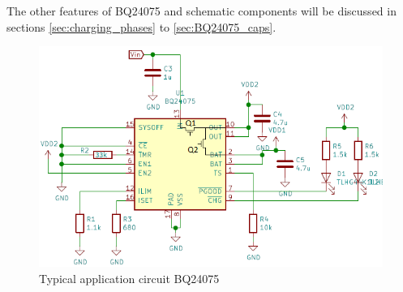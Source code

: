 \documentclass[11pt,a4paper]{article}
\begin{document}
The other features of BQ24075 and schematic components will be discussed in sections \ref{sec:charging_phases} to \ref{sec:BQ24075_caps}.
\begin{figure}[H]
	\centering
	\includegraphics[width=0.9\linewidth]{bq24075_toegepast.png}
	\caption{Typical application circuit BQ24075}
	\label{fig:bq24075_toegepast}
\end{figure}
\end{document}
